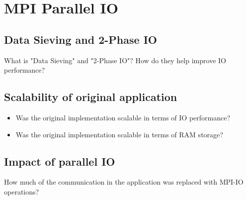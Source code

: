 \documentclass[9pt,pdftex,xcolor=dvipsnames]{beamer}
\begin{document}
\section{MPI Parallel IO}
\begin{frame}{\phantom{Contents}}
\tableofcontents[
  currentsection  
]
\end{frame}


\subsection{Data Sieving and 2-Phase IO}
\begin{frame}{\insertsubsection}
What is "Data Sieving" and "2-Phase IO"? How do they help improve IO performance?
\end{frame}


\subsection{Scalability of original application}
\begin{frame}{\insertsubsection}
\begin{itemize}
\item Was the original implementation scalable in terms of IO performance?
\item Was the original implementation scalable in terms of RAM storage?
\end{itemize}
\end{frame}


\subsection{Impact of parallel IO}
\begin{frame}{\insertsubsection}
How much of the communication in the application was replaced with MPI-IO operations?
\end{frame}
\end{document}

